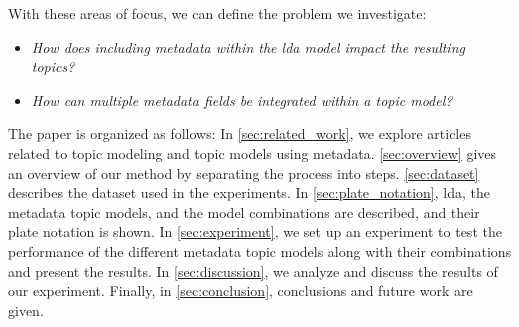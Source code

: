 With these areas of focus, we can define the problem we investigate:

\begin{itemize}
	\item \textit{How does including metadata within the \gls{lda} model impact the resulting topics?}
	\item \textit{How can multiple metadata fields be integrated within a topic model?}
\end{itemize}

The paper is organized as follows:
In \autoref{sec:related_work}, we explore articles related to topic modeling and topic models using metadata.
\autoref{sec:overview} gives an overview of our method by separating the process into steps.
\autoref{sec:dataset} describes the dataset used in the experiments.
In \autoref{sec:plate_notation}, \gls{lda}, the metadata topic models, and the model combinations are described, and their plate notation is shown.
In \autoref{sec:experiment}, we set up an experiment to test the performance of the different metadata topic models along with their combinations and present the results.
In \autoref{sec:discussion}, we analyze and discuss the results of our experiment.
Finally, in \autoref{sec:conclusion}, conclusions and future work are given.
